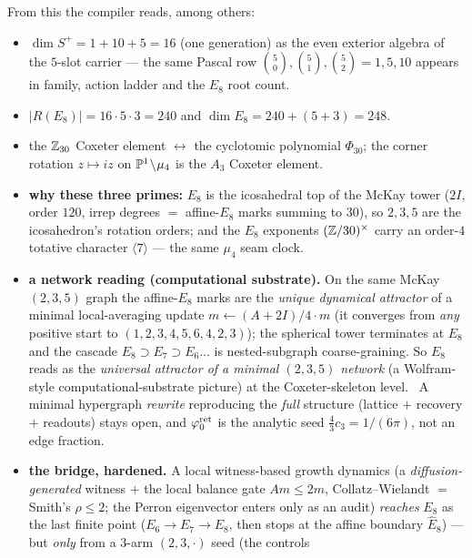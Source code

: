 \noindent From this the compiler reads, among others:
\begin{itemize}[leftmargin=1.4em]
\item $\dim S^+ = 1+10+5 = 16$ (one generation) as the even exterior algebra of the $5$-slot carrier ---
      the same Pascal row $\binom50,\binom51,\binom52 = 1,5,10$ appears in family, action ladder and the
      $E_8$ root count. \mE
\item $|R(E_8)| = 16\cdot5\cdot3 = 240$ and $\dim E_8 = 240 + (5+3) = 248$. \mE
\item the $\mathbb{Z}_{30}$ Coxeter element $\leftrightarrow$ the cyclotomic polynomial $\Phi_{30}$; the corner
      rotation $z\mapsto iz$ on $\mathbb{P}^1\!\setminus\!\mu_4$ is the $A_3$ Coxeter element. \mE
\item \textbf{why these three primes:} $E_8$ is the icosahedral top of the McKay tower
      ($2I$, order $120$, irrep degrees $=$ affine-$E_8$ marks summing to $30$), so $2,3,5$ are the
      icosahedron's rotation orders; and the $E_8$ exponents $(\mathbb{Z}/30)^\times$ carry an order-$4$ totative
      character $\langle7\rangle$ --- the same $\mu_4$ seam clock. \mE\
       
\item \textbf{a network reading (computational substrate).} On the same McKay $(2,3,5)$ graph the affine-$E_8$
      marks are the \emph{unique dynamical attractor} of a minimal local-averaging update
      $m\!\leftarrow\!(A{+}2I)/4\cdot m$ (it converges from \emph{any} positive start to $(1,2,3,4,5,6,4,2,3)$);
      the spherical tower terminates at $E_8$ and the cascade $E_8\!\supset\!E_7\!\supset\!E_6\!\dots$ is
      nested-subgraph coarse-graining. So $E_8$ reads as the \emph{universal attractor of a minimal $(2,3,5)$
      network} (a Wolfram-style computational-substrate picture) at the Coxeter-skeleton level. \mC\ A minimal
      hypergraph \emph{rewrite} reproducing the \emph{full} structure (lattice $+$ recovery $+$ readouts) stays
      open, and $\varphi_0^{\mathrm{ret}}$ is the analytic seed $\tfrac{4}{3}c_3=1/(6\pi)$, not an edge fraction. \mO\
\item \textbf{the bridge, hardened.} A local witness-based growth dynamics (a \emph{diffusion-generated} witness
      $+$ the local balance gate $A m\le2m$, Collatz--Wielandt $=$ Smith's $\rho\le2$; the Perron eigenvector
      enters only as an audit) \emph{reaches} $E_8$ as the last finite point ($E_6\!\to\!E_7\!\to\!E_8$, then
      stops at the affine boundary $\hat E_8$) --- but \emph{only} from a 3-arm $(2,3,\cdot)$ seed (the controls

\end{itemize}
